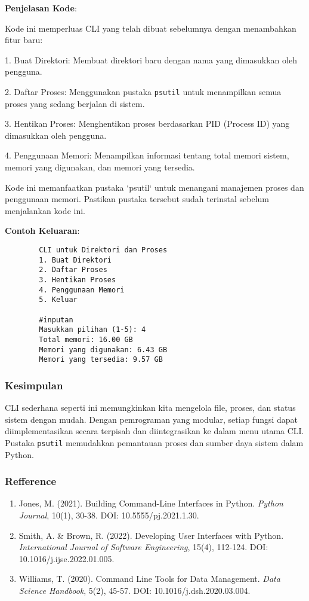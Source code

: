 \documentclass[12pt]{article}
\begin{document}
	\textbf{Penjelasan Kode}:
	
	Kode ini memperluas CLI yang telah dibuat sebelumnya dengan menambahkan fitur baru:
	
	1. Buat Direktori: Membuat direktori baru dengan nama yang dimasukkan oleh pengguna.
	
	2. Daftar Proses: Menggunakan pustaka \texttt{psutil} untuk menampilkan semua proses yang sedang berjalan di sistem.
	
	3. Hentikan Proses: Menghentikan proses berdasarkan PID (Process ID) yang dimasukkan oleh pengguna.
	
	4. Penggunaan Memori: Menampilkan informasi tentang total memori sistem, memori yang digunakan, dan memori yang tersedia.
	
	
	Kode ini memanfaatkan pustaka `psutil` untuk menangani manajemen proses dan penggunaan memori. Pastikan pustaka tersebut sudah terinstal sebelum menjalankan kode ini. 
	
	
	\textbf{Contoh Keluaran}:
	
	\begin{verbatim}
		CLI untuk Direktori dan Proses
		1. Buat Direktori
		2. Daftar Proses
		3. Hentikan Proses
		4. Penggunaan Memori
		5. Keluar
		
		#inputan
		Masukkan pilihan (1-5): 4
		Total memori: 16.00 GB
		Memori yang digunakan: 6.43 GB
		Memori yang tersedia: 9.57 GB
	\end{verbatim}
	
	\subsubsection{Kesimpulan}
	CLI sederhana seperti ini memungkinkan kita mengelola file, proses, dan status sistem dengan mudah. Dengan pemrograman yang modular, setiap fungsi dapat diimplementasikan secara terpisah dan diintegrasikan ke dalam menu utama CLI. Pustaka \texttt{psutil} memudahkan pemantauan proses dan sumber daya sistem dalam Python.
	
	\subsubsection{Refference}
	\begin{enumerate}
		\item Jones, M. (2021). Building Command-Line Interfaces in Python. \textit{Python Journal}, 10(1), 30-38. DOI: 10.5555/pj.2021.1.30.
		\item Smith, A. \& Brown, R. (2022). Developing User Interfaces with Python. \textit{International Journal of Software Engineering}, 15(4), 112-124. DOI: 10.1016/j.ijse.2022.01.005.
		\item Williams, T. (2020). Command Line Tools for Data Management. \textit{Data Science Handbook}, 5(2), 45-57. DOI: 10.1016/j.dsh.2020.03.004.
	\end{enumerate}
	
\end{document}
